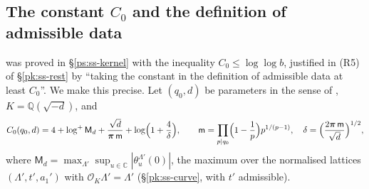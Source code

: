 \documentclass[10pt]{amsart}
\theoremstyle{definition}
\theoremstyle{remark}
\newcommand{\C}{\mathbb C}
\newcommand{\Q}{\mathbb Q}
\providecommand{\auO}{\mathcal O}
\begin{document}
\subsection{The constant $C_0$ and the definition of admissible data}\label{pz:ss-const}

{\cite[Proposition~14.23]{P46}} was proved in \S\ref{ps:ss-kernel} with the inequality $C_0\le\log\log
b$, justified in (R5) of \S\ref{pk:ss-rest} by ``taking the constant in the definition of
admissible data at least $C_0$''. We make this precise. Let $(q_0,d)$ be parameters in the sense
of {\cite[Definition~13.1]{P46}}, $K=\Q(\sqrt{-d})$, and
\begin{equation}\label{pz:eq-C0}
C_0(q_0,d)=4+\log^+\mathsf M_d+\frac{\sqrt d}{\boldsymbol\pi\,\mathsf m}+\log\Bigl(1+\frac4\delta\Bigr),
\qquad\mathsf m=\prod_{p\mid q_0}\Bigl(1-\frac1p\Bigr)p^{1/(p-1)},\quad\delta=\Bigl(\frac{2\boldsymbol
\pi\,\mathsf m}{\sqrt d}\Bigr)^{1/2},
\end{equation}
where $\mathsf M_d=\max_{\Lambda'}\sup_{u\in\C}|\theta^{\Lambda'}_u(0)|$, the maximum over the
normalised lattices $(\Lambda',t',a_1')$ with $\auO_K\Lambda'=\Lambda'$ (\S\ref{pk:ss-curve}, with
$t'$ admissible).
\end{document}
